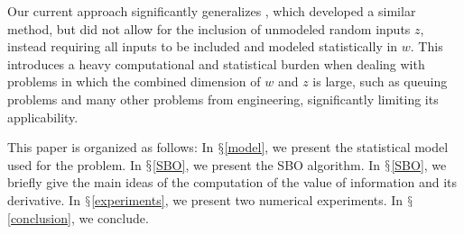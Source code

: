 \documentclass{article}
\newcommand{\w}{w}
\newcommand{\z}{z}
\newcommand{\pfcomment}[1]{{\color{red} PF: #1}}
\begin{document}


Our current approach significantly generalizes \cite{Xie:2012}, which developed a similar method, but did not allow for the inclusion of unmodeled random inputs $\z$, instead requiring all inputs to be included and modeled statistically in $\w$.  This introduces a heavy computational and statistical burden when dealing with problems in which the combined dimension of $\w$ and $\z$ is large, such as queuing problems and many other problems from engineering, significantly limiting its applicability.





This paper is organized as follows: In $\mathsection$\ref{model}, we present the statistical model used for the problem. In $\mathsection$\ref{SBO},
we present the SBO algorithm. In $\mathsection$\ref{SBO}, we briefly give the main ideas of the computation of the value of information and its derivative. 
In $\mathsection$\ref{experiments}, we present two numerical experiments. In $\mathsection$\ref{conclusion}, we conclude.


\end{document}

